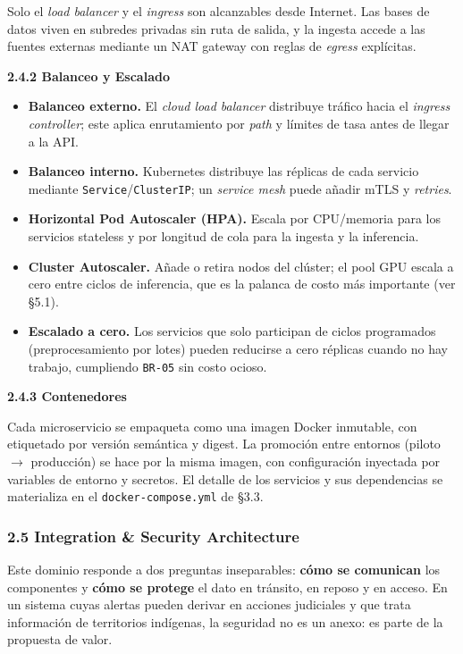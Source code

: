 \documentclass{article}
\newcommand{\mdhfour}[1]{\par\medskip\noindent\textbf{#1}\par\nobreak\smallskip}
\begin{document}
Solo el \emph{load balancer} y el \emph{ingress} son alcanzables desde Internet. Las bases de datos viven en subredes privadas sin ruta de salida, y la ingesta accede a las fuentes externas mediante un NAT gateway con reglas de \emph{egress} explícitas.

\mdhfour{2.4.2 Balanceo y Escalado}

\begin{itemize}
  \item \textbf{Balanceo externo.} El \emph{cloud load balancer} distribuye tráfico hacia el \emph{ingress controller}; este aplica enrutamiento por \emph{path} y límites de tasa antes de llegar a la API.
  \item \textbf{Balanceo interno.} Kubernetes distribuye las réplicas de cada servicio mediante \texttt{Service}/\texttt{ClusterIP}; un \emph{service mesh} puede añadir mTLS y \emph{retries}.
  \item \textbf{Horizontal Pod Autoscaler (HPA).} Escala por CPU/memoria para los servicios stateless y por longitud de cola para la ingesta y la inferencia.
  \item \textbf{Cluster Autoscaler.} Añade o retira nodos del clúster; el pool GPU escala a cero entre ciclos de inferencia, que es la palanca de costo más importante (ver \S{}5.1).
  \item \textbf{Escalado a cero.} Los servicios que solo participan de ciclos programados (preprocesamiento por lotes) pueden reducirse a cero réplicas cuando no hay trabajo, cumpliendo \texttt{BR-\allowbreak{}05} sin costo ocioso.
\end{itemize}

\mdhfour{2.4.3 Contenedores}

Cada microservicio se empaqueta como una imagen Docker inmutable, con etiquetado por versión semántica y digest. La promoción entre entornos (piloto \ensuremath{\rightarrow} producción) se hace por la misma imagen, con configuración inyectada por variables de entorno y secretos. El detalle de los servicios y sus dependencias se materializa en el \texttt{docker-\allowbreak{}compose.\allowbreak{}yml} de \S{}3.3.

\subsubsection{2.5 Integration \& Security Architecture}

Este dominio responde a dos preguntas inseparables: \textbf{cómo se comunican} los componentes y \textbf{cómo se protege} el dato en tránsito, en reposo y en acceso. En un sistema cuyas alertas pueden derivar en acciones judiciales y que trata información de territorios indígenas, la seguridad no es un anexo: es parte de la propuesta de valor.
\end{document}
